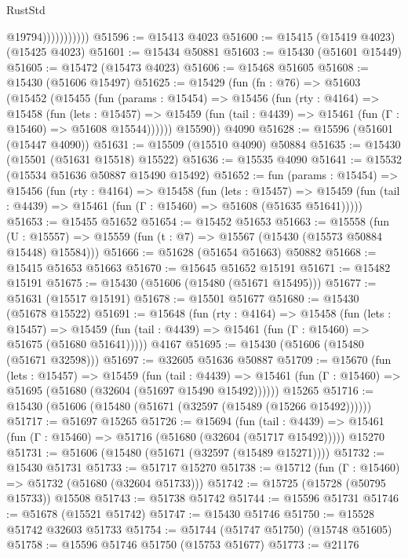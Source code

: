 \begin{lexlean}{RustStd}
\begin{coremodule}
{\begin{coremodule}
{{{{{{{{{{{{{{{{{{{{{{{{{{{{{{{{{{{{{{{{{{{{{{{{{{{{{{{{{{{{                          @19794)))))))))))
@51596 := @15413 @4023
@51600 := @15415 (@15419 @4023) (@15425 @4023)
@51601 := @15434 @50881
@51603 := @15430 (@51601 @15449)
@51605 := @15472 (@15473 @4023)
@51606 := @15468 @51605
@51608 := @15430 (@51606 @15497)
@51625 := @15429
    (fun (fn : @76) =>
    @51603
      (@15452
        (@15455
          (fun (params : @15454) =>
          @15456
            (fun (rty : @4164) =>
            @15458
              (fun (lets : @15457) =>
              @15459 (fun (tail : @4439) => @15461 (fun (Γ : @15460) => @51608 @15544))))))
        @15590))
    @4090
@51628 := @15596 (@51601 (@15447 @4090))
@51631 := @15509 (@15510 @4090) @50884
@51635 := @15430 (@15501 (@51631 @15518) @15522)
@51636 := @15535 @4090
@51641 := @15532 (@15534 @51636 @50887 @15490 @15492)
@51652 := fun (params : @15454) =>
  @15456
    (fun (rty : @4164) =>
    @15458
      (fun (lets : @15457) =>
      @15459 (fun (tail : @4439) => @15461 (fun (Γ : @15460) => @51608 (@51635 @51641)))))
@51653 := @15455 @51652
@51654 := @15452 @51653
@51663 := @15558
    (fun (U : @15557) => @15559 (fun (t : @7) => @15567 (@15430 (@15573 @50884 @15448) @15584)))
@51666 := @51628 (@51654 @51663) @50882
@51668 := @15415 @51653 @51663
@51670 := @15645 @51652 @15191
@51671 := @15482 @15191
@51675 := @15430 (@51606 (@15480 (@51671 @15495)))
@51677 := @51631 (@15517 @15191)
@51678 := @15501 @51677
@51680 := @15430 (@51678 @15522)
@51691 := @15648
    (fun (rty : @4164) =>
    @15458
      (fun (lets : @15457) =>
      @15459 (fun (tail : @4439) => @15461 (fun (Γ : @15460) => @51675 (@51680 @51641)))))
    @4167
@51695 := @15430 (@51606 (@15480 (@51671 @32598)))
@51697 := @32605 @51636 @50887
@51709 := @15670
    (fun (lets : @15457) =>
    @15459
      (fun (tail : @4439) =>
      @15461 (fun (Γ : @15460) => @51695 (@51680 (@32604 (@51697 @15490 @15492))))))
    @15265
@51716 := @15430 (@51606 (@15480 (@51671 (@32597 (@15489 (@15266 @15492))))))
@51717 := @51697 @15265
@51726 := @15694
    (fun (tail : @4439) => @15461 (fun (Γ : @15460) => @51716 (@51680 (@32604 (@51717 @15492)))))
    @15270
@51731 := @51606 (@15480 (@51671 (@32597 (@15489 @15271))))
@51732 := @15430 @51731
@51733 := @51717 @15270
@51738 := @15712 (fun (Γ : @15460) => @51732 (@51680 (@32604 @51733)))
@51742 := @15725 (@15728 (@50795 @15733)) @15508
@51743 := @51738 @51742
@51744 := @15596 @51731
@51746 := @51678 (@15521 @51742)
@51747 := @15430 @51746
@51750 := @15528 @51742 @32603 @51733
@51754 := @51744 (@51747 @51750) (@15748 @51605)
@51758 := @15596 @51746 @51750 (@15753 @51677)
@51773 := @21176
}}}}}}}}}}}}}}}}}}}}}}}}}}}}}}}}}}}}}}}}}}}}}}}}}}}}}}}}}}}}
\end{coremodule}}
\end{coremodule}
\end{lexlean}
